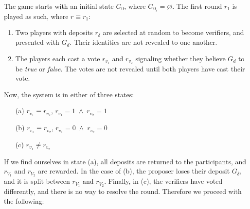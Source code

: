 The game starts with an initial state $G_0$, where $G_{0_r} = \varnothing$.
The first round $r_1$ is played as such, where $r \equiv r_1$:

\begin{enumerate}
    \item Two players with deposits $r_{\delta}$ are selected at random to
        become verifiers, and presented with $G_d$. Their identities are not
        revealed to one another.
    \item The players each cast a vote $r_{v_1}$ and $r_{v_2}$ signaling
        whether they believe $G_d$ to be \emph{true} or \emph{false}. The votes
        are not revealed until both players have cast their vote.
\end{enumerate}

Now, the system is in either of three states:

\begin{enumerate}
    \item[(a)] $r_{v_1} \equiv r_{v_2}$, \qquad $r_{v_1} = 1 \; \wedge \; r_{v_2} = 1$
    \item[(b)] $r_{v_1} \equiv r_{v_2}$, \qquad $r_{v_1} = 0 \; \wedge \; r_{v_2} = 0$
    \item[(c)] $r_{v_1} \not\equiv r_{v_2}$
\end{enumerate}

If we find ourselves in state (a), all deposits are returned to the
participants, and $r_{V_1}$ and $r_{V_2}$ are rewarded.  In the case of (b),
the proposer loses their deposit $G_{\delta}$, and it is split between
$r_{V_1}$ and $r_{V_2}$.  Finally, in (c), the verifiers have voted
differently, and there is no way to resolve the round.  Therefore we proceed
with the following:

